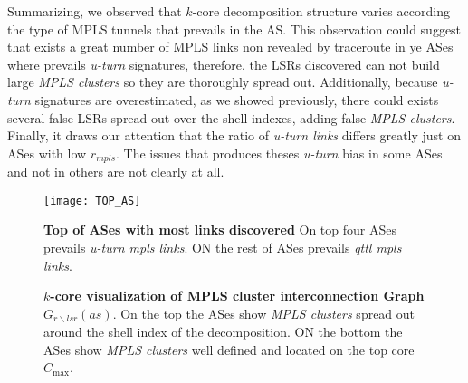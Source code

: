 Summarizing, we observed that  $k$-core decomposition structure varies according the type of MPLS tunnels that prevails in the AS. This observation could suggest that exists a great number of MPLS links non revealed by traceroute in ye ASes where prevails \textit{u-turn} signatures, therefore, 
the LSRs discovered can not build large \textit{MPLS clusters} so they
are thoroughly spread out. Additionally, because \textit{u-turn} signatures are
overestimated, as we showed previously, there could exists several false LSRs
spread out over the shell indexes, adding false \textit{MPLS clusters}. Finally, it draws our attention that the ratio of \textit{u-turn links} differs greatly just on ASes with low $r_{mpls}$. The issues that produces theses \textit{u-turn} bias in some ASes and not in others are not clearly at all.


\begin{figure}[!htb]
\centering
\texttt{[image: TOP\_AS]}
\caption{\textbf{Top of ASes with most links discovered} On top four ASes prevails \textit{u-turn mpls links}. ON the rest of ASes prevails \textit{qttl mpls links}.}
\label{top_as}
\end{figure}

\begin{figure*}[!htb]
\centering
\subfloat[AS1299  Teliasonera AB , $C_{\max}=21$, $\text{Degree}_{\max}=2781$]{\texttt{[image: 1299]}%
\label{fig_cluster_mpls_1299}}
\hfill
\subfloat[AS174 Congent Communication, $C_{\max}=8$, $\text{Degree}_{\max}=751$]{\texttt{[image: 174]}%
\label{fig_cluster_mpls_174}}
\hfill
\subfloat[AS6762 Telecom Italia, $C_{\max}=10$, $\text{Degree}_{\max}=564$]{\texttt{[image: 6762]}%
\label{fig_cluster_mpls_6762}}
\hfill
\subfloat[AS7018 AT\&T, $C_{\max}=3$, $\text{Degree}_{\max}=745$]{\texttt{[image: 2914]}%
\label{fig_cluster_mpls_2914}}
\hfil
\subfloat[ AS1273 Cable and Wireless Worldwide plc, $C_{\max}=3$, $\text{Degree}_{\max}=806$]{\texttt{[image: 1273]}%
\label{fig_cluster_mpls_1273}}
\hfil
\subfloat[AS2914 Citicorp, $C_{\max}=4$, $\text{Degree}_{\max}=745$]{\texttt{[image: 7018]}%
\label{fig_cluster_mpls_7018}}
\caption{\textbf{$k$-core visualization of MPLS cluster interconnection Graph $G_{r\backslash lsr}(as)$}. On the top the ASes show \textit{MPLS clusters} spread out around the shell index of the decomposition. ON the bottom the ASes show \textit{MPLS clusters} well defined and located on the top core $C_{\max}$.}
\label{fig_cluster_mpls}
\end{figure*}